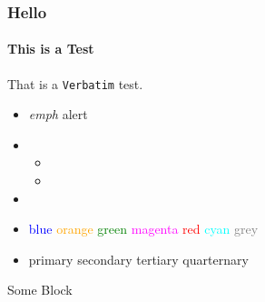 \documentclass[aspectratio=169]{beamer}
\begin{document}
\begin{frame}
    \frametitle{Hello}
    \framesubtitle{This is a Test}
    \lipsum[1][2-3]
    That is a \texttt{Verbatim} test.
    \begin{itemize}
        \item {} \emph{emph}    \alert{alert}
        \item \lipsum[1][1]
        \begin{itemize}
            \item \lipsum[1][2-4]
            \item \lipsum[1][1]
        \end{itemize}
        \item \lipsum[1][2-4]
        \item
            \textcolor{blue}{blue}
            \textcolor{orange}{orange}
            \textcolor{green}{green}
            \textcolor{magenta}{magenta}
            \textcolor{red}{red}
            \textcolor{cyan}{cyan}
            \textcolor{grey}{grey}
        \item
            \textcolor{primary}{primary}
            \textcolor{secondary}{secondary}
            \textcolor{tertiary}{tertiary}
            \textcolor{quarternary}{quarternary}
    \end{itemize}
    \begin{block}{Some Block}
       \lipsum[1][1] \faChessKnight
    \end{block}
\end{frame}
\end{document}

